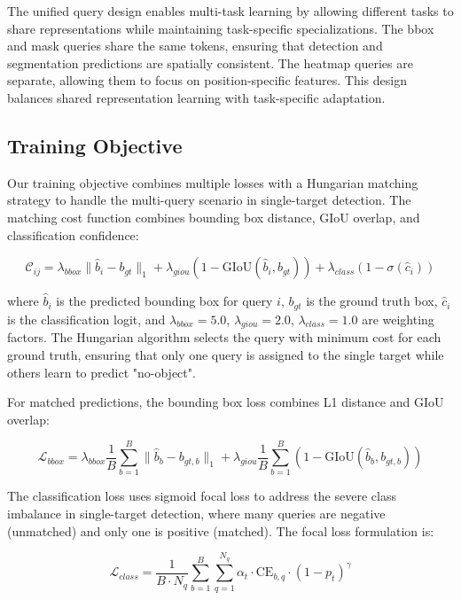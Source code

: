 The unified query design enables multi-task learning by allowing different tasks to share representations while maintaining task-specific specializations. The bbox and mask queries share the same tokens, ensuring that detection and segmentation predictions are spatially consistent. The heatmap queries are separate, allowing them to focus on position-specific features. This design balances shared representation learning with task-specific adaptation.

\subsection{Training Objective}

Our training objective combines multiple losses with a Hungarian matching strategy to handle the multi-query scenario in single-target detection. The matching cost function combines bounding box distance, GIoU overlap, and classification confidence:

\begin{equation}
\mathcal{C}_{ij} = \lambda_{bbox} \|\hat{b}_i - b_{gt}\|_1 + \lambda_{giou} (1 - \text{GIoU}(\hat{b}_i, b_{gt})) + \lambda_{class} (1 - \sigma(\hat{c}_i))
\end{equation}

where $\hat{b}_i$ is the predicted bounding box for query $i$, $b_{gt}$ is the ground truth box, $\hat{c}_i$ is the classification logit, and $\lambda_{bbox} = 5.0$, $\lambda_{giou} = 2.0$, $\lambda_{class} = 1.0$ are weighting factors. The Hungarian algorithm selects the query with minimum cost for each ground truth, ensuring that only one query is assigned to the single target while others learn to predict "no-object".

For matched predictions, the bounding box loss combines L1 distance and GIoU overlap:

\begin{equation}
\mathcal{L}_{bbox} = \lambda_{bbox} \frac{1}{B} \sum_{b=1}^{B} \|\hat{b}_b - b_{gt,b}\|_1 + \lambda_{giou} \frac{1}{B} \sum_{b=1}^{B} (1 - \text{GIoU}(\hat{b}_b, b_{gt,b}))
\end{equation}

The classification loss uses sigmoid focal loss to address the severe class imbalance in single-target detection, where many queries are negative (unmatched) and only one is positive (matched). The focal loss formulation is:

\begin{equation}
\mathcal{L}_{class} = \frac{1}{B \cdot N_q} \sum_{b=1}^{B} \sum_{q=1}^{N_q} \alpha_t \cdot \text{CE}_{b,q} \cdot (1 - p_t)^{\gamma}
\end{equation}

